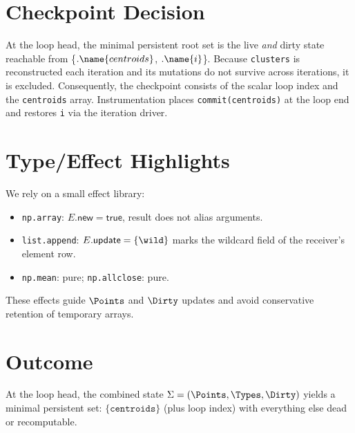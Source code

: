 \section*{Checkpoint Decision}
At the loop head, the minimal persistent root set is the live \emph{and} dirty state reachable from
\{\LOCALS$.\name{centroids}$, \LOCALS$.\name{i}$\}.
Because \texttt{clusters} is reconstructed each iteration and its mutations do not survive across iterations, it is excluded.
Consequently, the checkpoint consists of the scalar loop index and the \texttt{centroids} array.
Instrumentation places \verb|commit(centroids)| at the loop end and restores \verb|i| via the iteration driver.

\section*{Type/Effect Highlights}
We rely on a small effect library:
\begin{itemize}
\item \texttt{np.array}: $E.\mathsf{new}=\mathsf{true}$, result does not alias arguments.
\item \texttt{list.append}: $E.\mathsf{update}=\{\wild\}$ marks the wildcard field of the receiver’s element row.
\item \texttt{np.mean}: pure; \texttt{np.allclose}: pure.
\end{itemize}
These effects guide $\Points$ and $\Dirty$ updates and avoid conservative retention of temporary arrays.

\section*{Outcome}
At the loop head, the combined state $\Sigma=(\Points,\Types,\Dirty)$ yields a minimal persistent set: $\{\texttt{centroids}\}$ (plus loop index) with everything else dead or recomputable.
